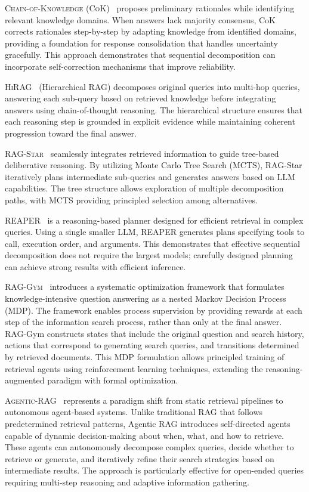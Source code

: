\documentclass{article}
\begin{document}
\textsc{Chain-of-Knowledge (CoK)}~\citep{CoK} proposes preliminary rationales while identifying relevant knowledge domains. When answers lack majority consensus, CoK corrects rationales step-by-step by adapting knowledge from identified domains, providing a foundation for response consolidation that handles uncertainty gracefully. This approach demonstrates that sequential decomposition can incorporate self-correction mechanisms that improve reliability.

\textsc{HiRAG}~\citep{HiRAG} (Hierarchical RAG) decomposes original queries into multi-hop queries, answering each sub-query based on retrieved knowledge before integrating answers using chain-of-thought reasoning. The hierarchical structure ensures that each reasoning step is grounded in explicit evidence while maintaining coherent progression toward the final answer.

\textsc{RAG-Star}~\citep{RAG-Star} seamlessly integrates retrieved information to guide tree-based deliberative reasoning. By utilizing Monte Carlo Tree Search (MCTS), RAG-Star iteratively plans intermediate sub-queries and generates answers based on LLM capabilities. The tree structure allows exploration of multiple decomposition paths, with MCTS providing principled selection among alternatives.

\textsc{REAPER}~\citep{REAPER} is a reasoning-based planner designed for efficient retrieval in complex queries. Using a single smaller LLM, REAPER generates plans specifying tools to call, execution order, and arguments. This demonstrates that effective sequential decomposition does not require the largest models; carefully designed planning can achieve strong results with efficient inference.

\textsc{RAG-Gym}~\citep{RAGGym} introduces a systematic optimization framework that formulates knowledge-intensive question answering as a nested Markov Decision Process (MDP). The framework enables process supervision by providing rewards at each step of the information search process, rather than only at the final answer. RAG-Gym constructs states that include the original question and search history, actions that correspond to generating search queries, and transitions determined by retrieved documents. This MDP formulation allows principled training of retrieval agents using reinforcement learning techniques, extending the reasoning-augmented paradigm with formal optimization.

\textsc{Agentic-RAG}~\citep{AgenticRAG} represents a paradigm shift from static retrieval pipelines to autonomous agent-based systems. Unlike traditional RAG that follows predetermined retrieval patterns, Agentic RAG introduces self-directed agents capable of dynamic decision-making about when, what, and how to retrieve. These agents can autonomously decompose complex queries, decide whether to retrieve or generate, and iteratively refine their search strategies based on intermediate results. The approach is particularly effective for open-ended queries requiring multi-step reasoning and adaptive information gathering.
\end{document}
